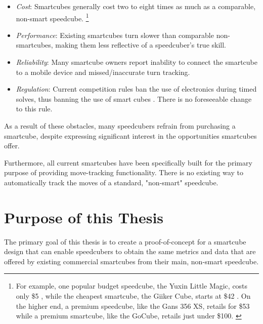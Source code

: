 \begin{itemize}

    \item \emph{Cost}: Smartcubes generally cost two to eight times as
    much as a comparable, non-smart speedcube. \footnote{For example,
    one popular budget speedcube, the Yuxin Little Magic, costs only
    \$5 \cite{yuxin-thecubicle}, while the cheapest smartcube, the
    Giiker Cube, starts at \$42 \cite{giiker-thecubicle}. On the higher
    end, a premium speedcube, like the Gans 356 XS, retails for \$53
    \cite{gans-xs-thecubicle} while a premium smartcube, like the
    GoCube, retails just under \$100. \cite{gocube-price}}
    
    \item \emph{Performance}: Existing smartcubes turn slower than
    comparable non-smartcubes, making them less reflective of a
    speedcuber's true skill. \cite{smartcube-regulation-discussion}
    
    \item \emph{Reliability}: Many smartcube owners report inability
    to connect the smartcube to a mobile device and missed/inaccurate
    turn tracking. \cite{smartcube-regulation-discussion}
    
    \item \emph{Regulation}: Current competition rules ban the use of
    electronics during timed solves, thus banning the use of smart
    cubes \cite{wca-regulations}. There is no foreseeable change to
    this rule. \cite{smartcube-regulation-discussion}
    
\end{itemize}

As a result of these obstacles, many speedcubers refrain from
purchasing a smartcube, despite expressing significant interest in the
opportunities smartcubes offer.

Furthermore, all current smartcubes have been specifically built for
the primary purpose of providing move-tracking functionality. There is
no existing way to automatically track the moves of a standard,
"non-smart" speedcube.


\section{Purpose of this Thesis}
\label{sec:thesis-purpose}

The primary goal of this thesis is to create a proof-of-concept for a
smartcube design that can enable speedcubers to obtain the same
metrics and data that are offered by existing commercial smartcubes
from their main, non-smart speedcube.

